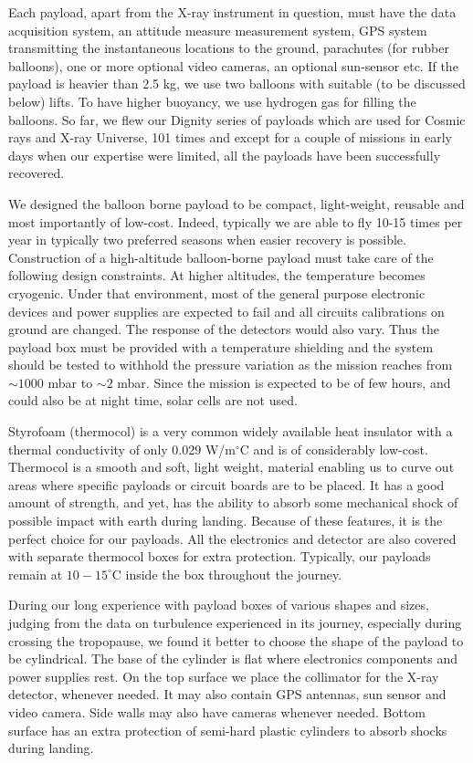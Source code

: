 Each payload, apart from the X-ray instrument in question, must have the data acquisition
system, an attitude measure measurement system, GPS system transmitting the instantaneous
locations to the ground, parachutes (for rubber balloons), one or more optional video cameras, 
an optional sun-sensor etc. If the payload is heavier than 2.5 kg, we use two balloons with suitable 
(to be discussed below) lifts. To have higher buoyancy, we use hydrogen gas for filling the 
balloons. So far, we flew our Dignity series of payloads which are used for Cosmic rays 
and X-ray Universe, 101 times and except for a couple of missions in early days when 
our expertise were limited, all the payloads have been successfully recovered.

We designed the balloon borne payload to be compact, light-weight, reusable
and most importantly of low-cost. Indeed, typically we are able to fly 10-15 times per year in 
typically two preferred seasons when easier recovery is possible. 
Construction of a high-altitude balloon-borne payload must take care of 
the following design constraints. At higher altitudes, the temperature 
becomes cryogenic. Under that environment, most of the general 
purpose electronic devices and power supplies are expected to fail
and all circuits calibrations on ground are changed. The response of the
detectors would also vary. Thus the payload box must be provided with a temperature
shielding and the system should be tested to withhold the pressure variation as the
mission reaches from $\sim 1000$ mbar to $\sim 2$ mbar. Since the mission is 
expected to be of few hours, and could also be at night time, solar cells are   
not used.

Styrofoam (thermocol) is a very common widely available heat
insulator with a thermal conductivity of only $0.029$ W/m$^{\circ}$C and is of
considerably low-cost. Thermocol is a smooth and 
soft, light weight, material enabling us to curve out areas where specific payloads or circuit boards
are to be placed. It has a good amount of strength, and yet, has 
the ability to absorb some mechanical shock of possible impact with earth during landing.
Because of these features, it is the perfect choice for our payloads. All
the electronics and detector are also covered with separate thermocol boxes
for extra protection. Typically, our payloads remain at $10-15^{\circ}$C 
inside the box throughout the journey. 

During our long experience with payload boxes of various shapes and sizes, 
judging from the data on turbulence experienced in its journey, especially during crossing 
the tropopause, we found it better to choose the shape of the payload to be cylindrical.
The base of the cylinder is flat where electronics components and power supplies rest.
On the top surface we place the collimator for the X-ray detector, whenever needed.
It may also contain GPS antennas, sun sensor and video camera. Side walls may also
have cameras whenever needed. Bottom surface has an extra protection of semi-hard 
plastic cylinders to absorb shocks during landing.

